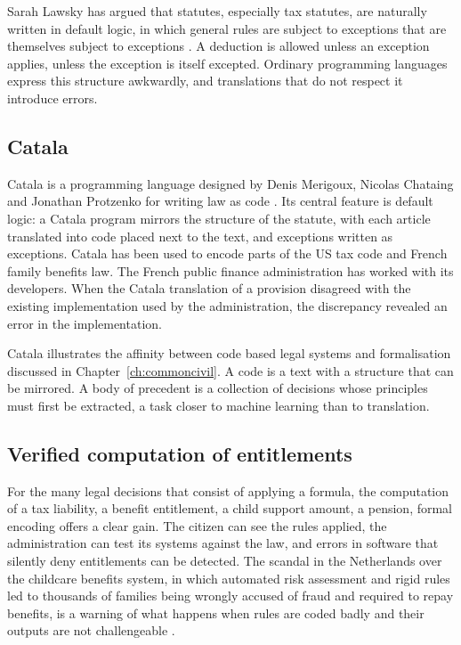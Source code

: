 Sarah Lawsky has argued that statutes, especially tax statutes, are naturally written in default logic, in which general rules are subject to exceptions that are themselves subject to exceptions \citep{lawsky2017}. A deduction is allowed unless an exception applies, unless the exception is itself excepted. Ordinary programming languages express this structure awkwardly, and translations that do not respect it introduce errors.

\subsection{Catala}

Catala is a programming language designed by Denis Merigoux, Nicolas Chataing and Jonathan Protzenko for writing law as code \citep{merigoux2021}. Its central feature is default logic: a Catala program mirrors the structure of the statute, with each article translated into code placed next to the text, and exceptions written as exceptions. Catala has been used to encode parts of the US tax code and French family benefits law. The French public finance administration has worked with its developers. When the Catala translation of a provision disagreed with the existing implementation used by the administration, the discrepancy revealed an error in the implementation.

Catala illustrates the affinity between code based legal systems and formalisation discussed in Chapter~\ref{ch:commoncivil}. A code is a text with a structure that can be mirrored. A body of precedent is a collection of decisions whose principles must first be extracted, a task closer to machine learning than to translation.

\subsection{Verified computation of entitlements}

For the many legal decisions that consist of applying a formula, the computation of a tax liability, a benefit entitlement, a child support amount, a pension, formal encoding offers a clear gain. The citizen can see the rules applied, the administration can test its systems against the law, and errors in software that silently deny entitlements can be detected. The scandal in the Netherlands over the childcare benefits system, in which automated risk assessment and rigid rules led to thousands of families being wrongly accused of fraud and required to repay benefits, is a warning of what happens when rules are coded badly and their outputs are not challengeable \citep{hadwick2022}.

